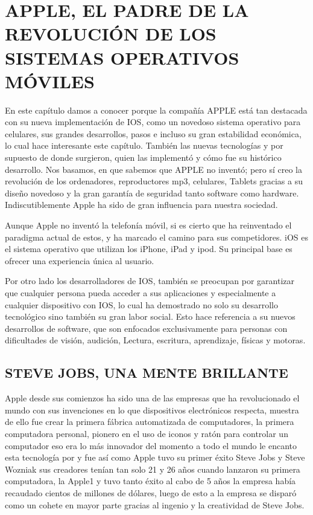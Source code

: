 \chapter*{APPLE, EL PADRE DE LA REVOLUCIÓN DE LOS SISTEMAS OPERATIVOS MÓVILES}

En este capítulo damos a conocer porque la compañía APPLE
está tan destacada con su nueva
implementación de IOS, como un novedoso
sistema operativo para celulares, sus grandes
desarrollos, pasos e incluso su gran estabilidad
económica, lo cual hace interesante este
capítulo. También las nuevas tecnologías y por
supuesto de donde surgieron, quien las
implementó y cómo fue su histórico desarrollo.
Nos basamos, en que sabemos que APPLE no
inventó; pero sí creo la revolución de los
ordenadores, reproductores mp3, celulares,
Tablets gracias a su diseño novedoso y la gran
garantía de seguridad tanto software como
hardware. Indiscutiblemente Apple ha sido de
gran influencia para nuestra sociedad.

Aunque Apple no inventó la telefonía móvil, si es cierto que ha
reinventado el paradigma actual de estos, y ha marcado el
camino para sus competidores. iOS es el sistema operativo que
utilizan los iPhone, iPad y ipod. Su principal base es ofrecer una
experiencia única al usuario.

Por otro lado los desarrolladores de IOS, también se preocupan
por garantizar que cualquier persona pueda acceder a sus
aplicaciones y especialmente a cualquier dispositivo con IOS, lo
cual ha demostrado no solo su desarrollo tecnológico sino
también su gran labor social. Esto hace referencia a su nuevos
desarrollos de software, que son enfocados exclusivamente para
personas con dificultades de visión, audición, Lectura, escritura,
aprendizaje, físicas y motoras.

\section*{STEVE JOBS, UNA MENTE BRILLANTE}

Apple desde sus comienzos ha sido una de las empresas que ha
revolucionado el mundo con sus invenciones en lo que
dispositivos electrónicos respecta, muestra de ello fue crear la
primera fábrica automatizada de computadores, la primera
computadora personal, pionero en el uso de iconos y ratón para
controlar un computador eso era lo más innovador del momento
a todo el mundo le encanto esta tecnología por y fue así como
Apple tuvo su primer éxito Steve Jobs y Steve Wozniak sus
creadores tenían tan solo 21 y 26 años cuando lanzaron su
primera computadora, la Apple1 y tuvo tanto éxito al cabo de 5
años la empresa había recaudado cientos de millones de dólares,
luego de esto a la empresa se disparó como un cohete en mayor
parte gracias al ingenio y la creatividad de Steve Jobs.

